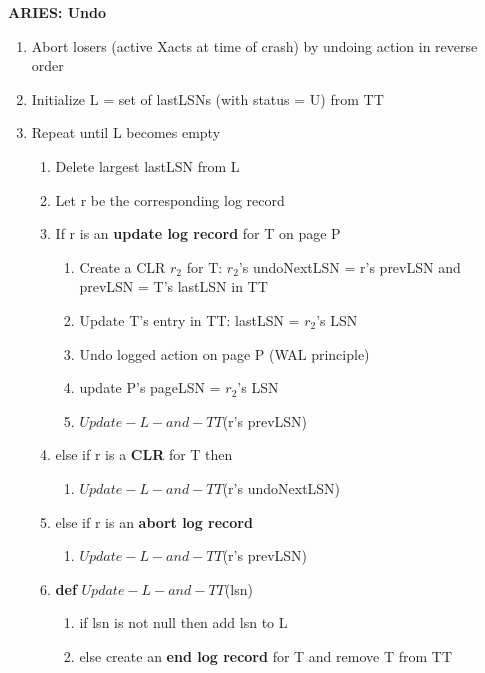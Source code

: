 \documentclass[8pt, landscape]{extarticle}
\begin{document}
\begin{multicols*}{4}
  \textbf{ARIES: Undo}
  \begin{enumerate}
    \item Abort losers (active Xacts at time of crash) by undoing action in reverse order
    \item Initialize L = set of lastLSNs (with status = U) from TT
    \item Repeat until L becomes empty
    \begin{enumerate}
      \item Delete largest lastLSN from L
      \item Let r be the corresponding log record
      \item If r is an \textbf{update log record} for T on page P
      \begin{enumerate}
        \item Create a CLR $r_2$ for T: $r_2$'s undoNextLSN = r's prevLSN and prevLSN = T's lastLSN in TT
        \item Update T's entry in TT: lastLSN = $r_2$'s LSN
        \item Undo logged action on page P (WAL principle)
        \item update P's pageLSN = $r_2$'s LSN
        \item $Update-L-and-TT$(r's prevLSN) 
      \end{enumerate}
      \item else if r is a \textbf{CLR} for T then 
      \begin{enumerate}
        \item $Update-L-and-TT$(r's undoNextLSN)
      \end{enumerate} 
      \item else if r is an \textbf{abort log record}
      \begin{enumerate}
        \item $Update-L-and-TT$(r's prevLSN)
      \end{enumerate}
      \item \textbf{def} $Update-L-and-TT$(lsn)
      \begin{enumerate}
        \item if lsn is not null then add lsn to L
        \item else create an \textbf{end log record} for T and remove T from TT
      \end{enumerate}
    \end{enumerate}
  \end{enumerate}

\end{multicols*}
\end{document}
